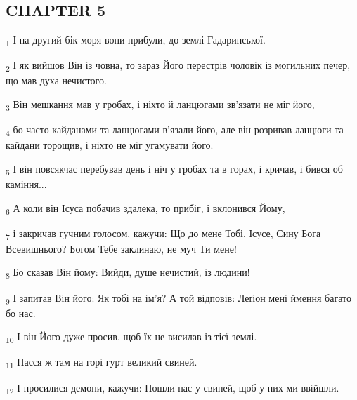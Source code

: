 \subsection{CHAPTER 5}
\begin{tcolorbox}
\textsubscript{1} І на другий бік моря вони прибули, до землі Гадаринської.
\end{tcolorbox}
\begin{tcolorbox}
\textsubscript{2} І як вийшов Він із човна, то зараз Його перестрів чоловік із могильних печер, що мав духа нечистого.
\end{tcolorbox}
\begin{tcolorbox}
\textsubscript{3} Він мешкання мав у гробах, і ніхто й ланцюгами зв'язати не міг його,
\end{tcolorbox}
\begin{tcolorbox}
\textsubscript{4} бо часто кайданами та ланцюгами в'язали його, але він розривав ланцюги та кайдани торощив, і ніхто не міг угамувати його.
\end{tcolorbox}
\begin{tcolorbox}
\textsubscript{5} І він повсякчас перебував день і ніч у гробах та в горах, і кричав, і бився об каміння...
\end{tcolorbox}
\begin{tcolorbox}
\textsubscript{6} А коли він Ісуса побачив здалека, то прибіг, і вклонився Йому,
\end{tcolorbox}
\begin{tcolorbox}
\textsubscript{7} і закричав гучним голосом, кажучи: Що до мене Тобі, Ісусе, Сину Бога Всевишнього? Богом Тебе заклинаю, не муч Ти мене!
\end{tcolorbox}
\begin{tcolorbox}
\textsubscript{8} Бо сказав Він йому: Вийди, душе нечистий, із людини!
\end{tcolorbox}
\begin{tcolorbox}
\textsubscript{9} І запитав Він його: Як тобі на ім'я? А той відповів: Леґіон мені ймення багато бо нас.
\end{tcolorbox}
\begin{tcolorbox}
\textsubscript{10} І він Його дуже просив, щоб їх не висилав із тієї землі.
\end{tcolorbox}
\begin{tcolorbox}
\textsubscript{11} Пасся ж там на горі гурт великий свиней.
\end{tcolorbox}
\begin{tcolorbox}
\textsubscript{12} І просилися демони, кажучи: Пошли нас у свиней, щоб у них ми ввійшли.
\end{tcolorbox}
